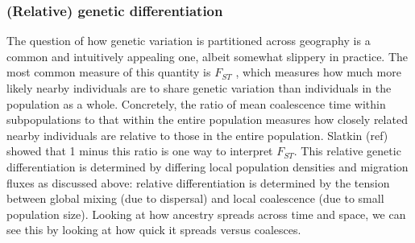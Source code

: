 \documentclass{ar-1col}
\newcommand{\todo}[1]{{\textbf{\color{red}{#1}}}}
\begin{document}
\todo{tidy and conclude}



\subsubsection{(Relative) genetic differentiation}

The question of how genetic variation is partitioned across
geography is a common and intuitively appealing one,
albeit somewhat slippery in practice.
The most common measure of this quantity is $F_{ST}$ \cite{wright},
which measures how much more likely nearby individuals are to share genetic variation than individuals in the population as a whole.
Concretely,
the ratio of mean coalescence time within subpopulations
to that within the entire population measures how closely related
nearby individuals are relative to those in the entire population.
Slatkin (ref) showed that 1 minus this ratio is one way to interpret $F_{ST}$.
This relative genetic differentiation is determined by differing local population densities
and migration fluxes as discussed above:
relative differentiation is determined by the tension between global mixing (due to dispersal)
and local coalescence (due to small population size).
Looking at how ancestry spreads across time and space,
we can see this by looking at how quick it spreads versus coalesces.
\end{document}

